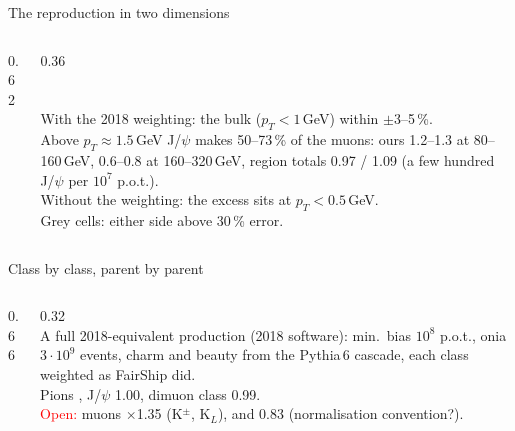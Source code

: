\documentclass[aspectratio=169,10pt]{beamer}
\newcommand{\legendline}[1]{{\color{muted}\lightfont\scriptsize #1}}
\begin{document}
\begin{frame}{The reproduction in two dimensions}
  \begin{columns}[c]
    \begin{column}{0.62\textwidth}
    \end{column}
    \begin{column}{0.36\textwidth}
      \\[0.5mm]
      \\[0.5mm]
      \\[1.5mm]
      \footnotesize
      With the 2018 weighting: the bulk ($p_T<1$\,GeV) within $\pm$3--5\,\%.\\[1mm]
      Above $p_T\approx1.5$\,GeV J/$\psi$ makes 50--73\,\% of the muons: ours 1.2--1.3 at 80--160\,GeV, 0.6--0.8 at 160--320\,GeV, region totals 0.97 / 1.09 (a few hundred J/$\psi$ per $10^7$ p.o.t.).\\[1mm]
      Without the weighting: the excess sits at $p_T<0.5$\,GeV.\\[0.5mm]
      \legendline{Grey cells: either side above 30\,\% error.}
    \end{column}
  \end{columns}
\end{frame}

\begin{frame}{Class by class, parent by parent}
  \begin{columns}[c]
    \begin{column}{0.66\textwidth}
      \\[0.5mm]
    \end{column}
    \begin{column}{0.32\textwidth}
      \\[1mm]
      \footnotesize
      A full 2018-equivalent production (2018 software): min.\ bias $10^8$ p.o.t., onia $3\cdot10^9$ events, charm and beauty from the Pythia\,6 cascade, each class weighted as FairShip did.\\[1mm]
      Pions , J/$\psi$ 1.00, dimuon class 0.99.\\[1mm]
      \textcolor{red}{Open:}  muons $\times$1.35 (K$^\pm$, K$_L$), and  0.83 (normalisation convention?).
    \end{column}
  \end{columns}
\end{frame}
\end{document}
